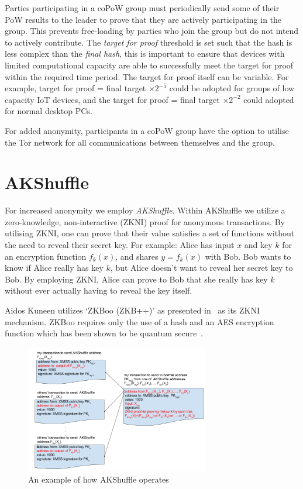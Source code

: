 \documentclass[a4paper,10pt,twocolumn]{article}
\begin{document}
Parties participating in a coPoW group must periodically send some of their PoW results to the leader to prove 
that they are actively participating in the group. This prevents free-loading by parties who join the group but do not intend to 
actively contribute. The \emph{target for proof} threshold is set such that the hash is less complex than the \emph{final hash},
this is important to ensure that devices with limited computational capacity are able to successfully meet the 
target for proof within the required time period. The target for proof itself can be variable. For example, target for proof = final 
target \(  \times 2^{-5} \) could be adopted for groups of low capacity IoT devices, and the target for proof = final target  \( \times 
2^{-2} \) could adopted for normal desktop PCs.

For added anonymity, participants in a coPoW group have the option to utilise the Tor network for all communications between themselves 
and the group. 

\section{AKShuffle}
\label{sec:aks}

For increased anonymity we employ \emph{AKShuffle}. Within AKShuffle we utilize a zero-knowledge, non-interactive (ZKNI) proof for
anonymous transactions. By utilising ZKNI, one can prove that their value satisfies a set of functions without the need to reveal their 
secret key. For example: Alice has input \(x\) and key \( k \) for an encryption function \( f_{k}(x) \), and shares \( y=f_k(x) \) 
with Bob. Bob wants to know if Alice really has key \(k\), but Alice doesn't want to reveal her secret key to Bob. By employing ZKNI, 
Alice can prove to Bob that she really has key \( k\) without ever actually having to reveal the key itself.

Aidos Kuneen utilizes `ZKBoo (ZKB++)' as presented in~\cite{zkb} as its ZKNI mechanism. ZKBoo requires only the use of a hash and an 
AES encryption function which has been shown to be quantum secure~\cite{pqcrypto}.

\begin{figure}[ht]
	\begin{center}
	\includegraphics[width=80mm]{shuffle.png}
	  \caption{An example of how AKShuffle operates}
    \label{fig:shuffle}
	\end{center}
 \end{figure}
\end{document}
